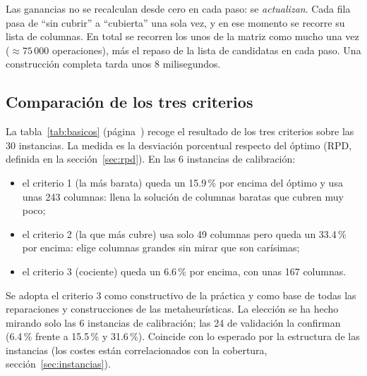 
\begin{idea}
Las ganancias no se recalculan desde cero en cada paso: se \emph{actualizan}. Cada fila pasa
de ``sin cubrir'' a ``cubierta'' una sola vez, y en ese momento se recorre su lista de
columnas. En total se recorren los unos de la matriz como mucho una vez ($\approx 75\,000$
operaciones), más el repaso de la lista de candidatas en cada paso. Una construcción
completa tarda unos 8 milisegundos.
\end{idea}

\subsection{Comparación de los tres criterios}\label{sec:res-voraz}

La tabla~\ref{tab:basicos} (página~\pageref{tab:basicos}) recoge el resultado de los tres
criterios sobre las 30 instancias. La medida es la desviación porcentual respecto del óptimo
(RPD, definida en la sección~\ref{sec:rpd}). En las 6 instancias de calibración:
\begin{itemize}
  \item el criterio 1 (la más barata) queda un 15.9\,\% por encima del óptimo y usa unas 243
        columnas: llena la solución de columnas baratas que cubren muy poco;
  \item el criterio 2 (la que más cubre) usa solo 49 columnas pero queda un 33.4\,\% por
        encima: elige columnas grandes sin mirar que son carísimas;
  \item el criterio 3 (cociente) queda un 6.6\,\% por encima, con unas 167 columnas.
\end{itemize}

\begin{decision}
Se adopta el criterio 3 como constructivo de la práctica y como base de todas las
reparaciones y construcciones de las metaheurísticas. La elección se ha hecho mirando solo
las 6 instancias de calibración; las 24 de validación la confirman (6.4\,\% frente a
15.5\,\% y 31.6\,\%). Coincide con lo esperado por la estructura de las instancias (los
costes están correlacionados con la cobertura, sección~\ref{sec:instancias}).
\end{decision}

